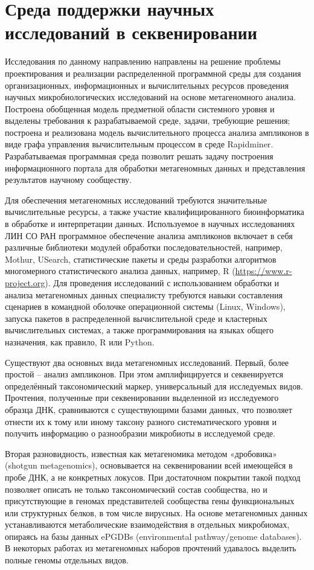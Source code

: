 \documentclass[a4paper,12pt,openany,final]{extreport}
\begin{document}
\chapter{Среда поддержки научных исследований в секвенировании}\label{chap:5}\label{do:cherk}

Исследования по данному направлению направлены на решение проблемы проектирования и реализации распределенной программной среды для создания организационных, информационных и вычислительных ресурсов проведения научных микробиологических исследований на основе метагеномного анализа. Построена обобщенная модель предметной области системного уровня и выделены требования к разрабатываемой среде, задачи, требующие решения; построена и реализована модель вычислительного процесса анализа ампликонов в виде графа управления вычислительным процессом в среде Rapidminer. Разрабатываемая программная среда позволит решать задачу построения информационного портала для обработки метагеномных данных и представления результатов научному сообществу.

Для обеспечения метагеномных исследований требуются значительные вычислительные ресурсы, а также участие квалифицированного биоинформатика в обработке и интерпретации данных. Используемое в научных исследованиях ЛИН СО РАН программное обеспечение анализа ампликонов включает в себя различные библиотеки модулей обработки последовательностей, например, Mothur, USearch, статистические пакеты и среды разработки алгоритмов многомерного статистического анализа данных, например, R (\href{https://www.r"=project.org/}{{https://www.r-project.org}}). Для проведения исследований с использованием обработки и анализа метагеномных данных специалисту требуются навыки составления сценариев в командной оболочке операционной системы (Linux, Windows), запуска пакетов в распределенной вычислительной среде и кластерных вычислительных системах, а также программирования на языках общего назначения, как правило, R или Python.

Существуют два основных вида метагеномных исследований. Первый, более простой -- анализ ампликонов. При этом амплифицируется и секвенируется определённый таксономический маркер, универсальный для исследуемых видов. Прочтения, полученные при секвенировании выделенной из исследуемого образца ДНК, сравниваются с существующими базами данных, что позволяет отнести их к тому или иному таксону разного систематического уровня и получить информацию о разнообразии микробиоты в исследуемой среде.

Вторая разновидность, известная как метагеномика методом «дробовика» (shotgun metagenomics), основывается на секвенировании всей имеющейся в пробе ДНК, а не конкретных локусов. При достаточном покрытии такой подход позволяет описать не только таксономический состав сообщества, но и присутствующие в геномах представителей сообщества гены функциональных или структурных белков, в том числе вирусных. На основе метагеномных данных устанавливаются метаболические взаимодействия в отдельных микробиомах, опираясь на базы данных ePGDBs (environmental pathway/genome databases). В некоторых работах из метагеномных наборов прочтений удавалось выделить полные геномы отдельных видов.
\end{document}
